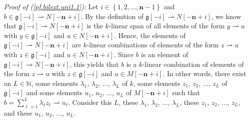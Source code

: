 \documentclass[etingof-lie.tex]{subfiles}
\begin{document}
\begin{noncompile}
\begin{verlong}
\textit{Proof of (\ref{pf.bilext.uni1.1}):} Let $i\in\left\{
1,2,...,\mathbf{n}-1\right\}  $ and $b\in\mathfrak{g}\left[  -i\right]
\rightharpoonup N\left[  -\mathbf{n}+i\right]  $. By the definition of
$\mathfrak{g}\left[  -i\right]  \rightharpoonup N\left[  -\mathbf{n}+i\right]
$, we know that $\mathfrak{g}\left[  -i\right]  \rightharpoonup N\left[
-\mathbf{n}+i\right]  $ is the $k$-linear span of all elements of the form
$y\rightharpoonup u$ with $y\in\mathfrak{g}\left[  -i\right]  $ and $u\in
N\left[  -\mathbf{n}+i\right]  $. Hence, the elements of $\mathfrak{g}\left[
-i\right]  \rightharpoonup N\left[  -\mathbf{n}+i\right]  $ are $k$-linear
combinations of elements of the form $z\rightharpoonup u$ with $z\in
\mathfrak{g}\left[  -i\right]  $ and $u\in N\left[  -\mathbf{n}+i\right]  $.
Since $b$ is an element of $\mathfrak{g}\left[  -i\right]  \rightharpoonup
N\left[  -\mathbf{n}+i\right]  $, this yields that $b$ is a $k$-linear
combination of elements of the form $z\rightharpoonup u$ with $z\in
\mathfrak{g}\left[  -i\right]  $ and $u\in M\left[  -\mathbf{n}+i\right]  $.
In other words, there exist an $L\in\mathbb{N}$, some elements $\lambda_{1}$,
$\lambda_{2}$, $...$, $\lambda_{L}$ of $k$, some elements $z_{1}$, $z_{2}$,
$...$, $z_{L}$ of $\mathfrak{g}\left[  -i\right]  $ and some elements $u_{1}$,
$u_{2}$, $...$, $u_{L}$ of $M\left[  -\mathbf{n}+i\right]  $ such that
$b=\sum\limits_{\ell=1}^{L}\lambda_{\ell}z_{\ell}\rightharpoonup u_{\ell}$.
Consider this $L$, these $\lambda_{1}$, $\lambda_{2}$, $...$, $\lambda_{L}$,
these $z_{1}$, $z_{2}$, $...$, $z_{L}$, and these $u_{1}$, $u_{2}$, $...$,
$u_{L}$.


\end{verlong}
\end{noncompile}
\end{document}
